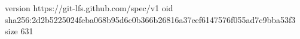 version https://git-lfs.github.com/spec/v1
oid sha256:2d2b5225024feba068b95d6c0b366b26816a37eef6147576f055ad7c9bba53f3
size 631
